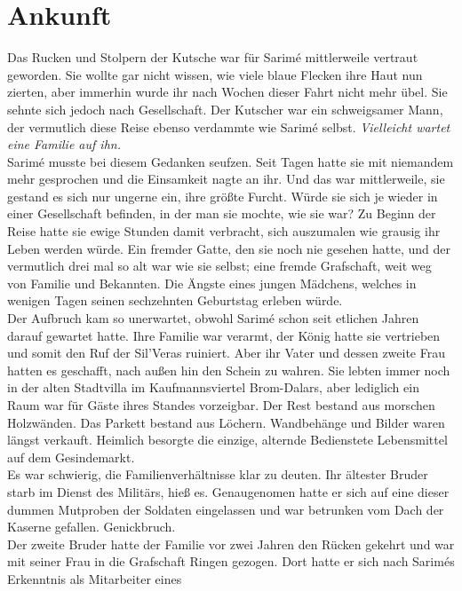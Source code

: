 \chapter{Ankunft}

Das Rucken und Stolpern der Kutsche war für Sarimé mittlerweile vertraut geworden. Sie wollte gar 
nicht wissen, wie viele blaue Flecken ihre Haut nun zierten, aber immerhin wurde ihr nach Wochen 
dieser Fahrt nicht mehr übel. Sie sehnte sich jedoch nach Gesellschaft. Der Kutscher war ein 
schweigsamer Mann, der vermutlich diese Reise ebenso verdammte wie Sarimé selbst.
\textit{Vielleicht wartet eine Familie auf ihn.}\\
Sarimé musste bei diesem Gedanken seufzen. Seit Tagen hatte sie mit niemandem mehr gesprochen und 
die Einsamkeit nagte an ihr. Und das war mittlerweile, sie gestand es sich nur ungerne ein, ihre 
größte Furcht. Würde sie sich je wieder in einer Gesellschaft befinden, in der man sie mochte, wie 
sie war? Zu Beginn der Reise hatte sie ewige Stunden damit verbracht, sich auszumalen wie grausig 
ihr Leben werden würde. Ein fremder Gatte, den sie noch nie gesehen hatte, und der vermutlich drei 
mal so alt war wie sie selbst; eine fremde Grafschaft, weit weg von Familie und Bekannten. Die 
Ängste eines jungen Mädchens, welches in wenigen Tagen seinen sechzehnten Geburtstag erleben 
würde.\\
Der Aufbruch kam so unerwartet, obwohl Sarimé schon seit etlichen Jahren darauf gewartet hatte. Ihre 
Familie war verarmt, der König hatte sie vertrieben und somit den Ruf der Sil'Veras ruiniert. Aber 
ihr Vater und dessen zweite Frau hatten es geschafft, nach außen hin den Schein zu wahren. Sie 
lebten immer noch in der alten Stadtvilla im Kaufmannsviertel Brom-Dalars, aber lediglich ein Raum 
war für Gäste ihres Standes vorzeigbar. Der Rest bestand aus morschen Holzwänden. Das Parkett 
bestand aus Löchern. Wandbehänge und Bilder waren längst verkauft. Heimlich besorgte die einzige, 
alternde Bedienstete Lebensmittel auf dem Gesindemarkt.\\
Es war schwierig, die Familienverhältnisse klar zu deuten. Ihr ältester Bruder starb im Dienst des 
Militärs, hieß es. Genaugenomen hatte er sich auf eine dieser dummen Mutproben der Soldaten 
eingelassen und war betrunken vom Dach der Kaserne gefallen. Genickbruch. \\
Der zweite Bruder hatte der Familie vor zwei Jahren den Rücken gekehrt und war mit seiner Frau in 
die Grafschaft Ringen gezogen. Dort hatte er sich nach Sarimés Erkenntnis als Mitarbeiter eines 

